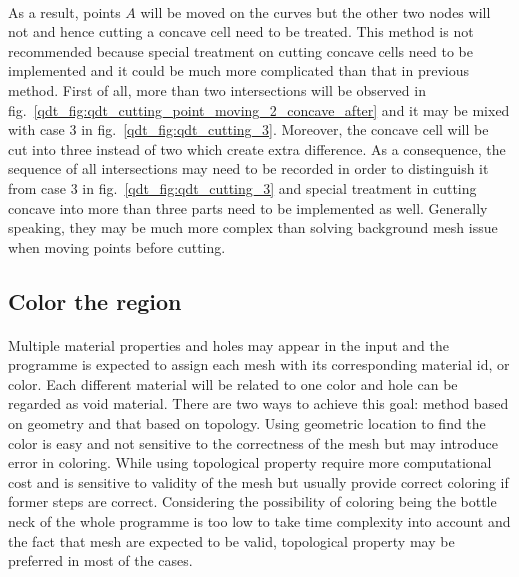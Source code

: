 \paragraph{}
As a result, points $A$ will be moved on the curves but the other two nodes will not and hence cutting a concave cell need to be treated.
This method is not recommended because special treatment on cutting concave cells need to be implemented and it could be much more complicated than that in previous method.
First of all, more than two intersections will be observed in fig.~\ref{qdt_fig:qdt_cutting_point_moving_2_concave_after} and it may be mixed with case 3 in fig.~\ref{qdt_fig:qdt_cutting_3}.
Moreover, the concave cell will be cut into three instead of two which create extra difference.
As a consequence, the sequence of all intersections may need to be recorded in order to distinguish it from case 3 in fig.~\ref{qdt_fig:qdt_cutting_3} and special treatment in cutting concave into more than three parts need to be implemented as well.
Generally speaking, they may be much more complex than solving background mesh issue when moving points before cutting.


\pagebreak


\subsection{Color the region}
\paragraph{}
Multiple material properties and holes may appear in the input and the programme is expected to assign each mesh with its corresponding material id, or color.
Each different material will be related to one color and hole can be regarded as void material.
There are two ways to achieve this goal: method based on geometry and that based on topology.
Using geometric location to find the color is easy and not sensitive to the correctness of the mesh but may introduce error in coloring.
While using topological property require more computational cost and is sensitive to validity of the mesh but usually provide correct coloring if former steps are correct.
Considering the possibility of coloring being the bottle neck of the whole programme is too low to take time complexity into account and the fact that mesh are expected to be valid, topological property may be preferred in most of the cases.

